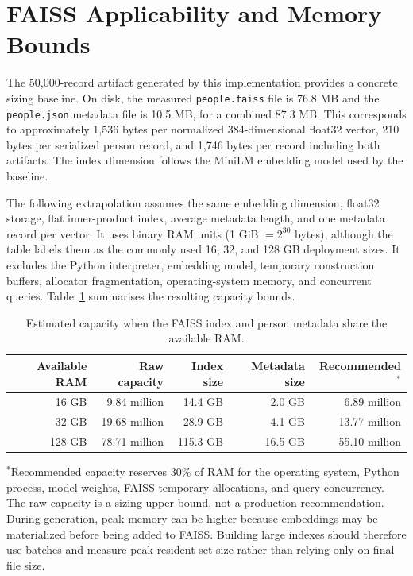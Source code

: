 \documentclass[11pt]{article}
\begin{document}
\section{FAISS Applicability and Memory Bounds}
The 50,000-record artifact generated by this implementation provides a concrete sizing baseline. On disk, the measured \texttt{people.faiss} file is 76.8 MB and the \texttt{people.json} metadata file is 10.5 MB, for a combined 87.3 MB. This corresponds to approximately 1,536 bytes per normalized 384-dimensional float32 vector, 210 bytes per serialized person record, and 1,746 bytes per record including both artifacts. The index dimension follows the MiniLM embedding model used by the baseline.

The following extrapolation assumes the same embedding dimension, float32 storage, flat inner-product index, average metadata length, and one metadata record per vector. It uses binary RAM units (1 GiB $=2^{30}$ bytes), although the table labels them as the commonly used 16, 32, and 128 GB deployment sizes. It excludes the Python interpreter, embedding model, temporary construction buffers, allocator fragmentation, operating-system memory, and concurrent queries. Table~\ref{tab:capacity} summarises the resulting capacity bounds.

\begin{table}[h]
\centering
\caption{Estimated capacity when the FAISS index and person metadata share the available RAM.}
\label{tab:capacity}
\begin{tabular}{rrrrr}
\toprule
Available RAM & Raw capacity & Index size & Metadata size & Recommended$^*$ \\
\midrule
16 GB & 9.84 million & 14.4 GB & 2.0 GB & 6.89 million \\
32 GB & 19.68 million & 28.9 GB & 4.1 GB & 13.77 million \\
128 GB & 78.71 million & 115.3 GB & 16.5 GB & 55.10 million \\
\bottomrule
\end{tabular}
\end{table}

\noindent
$^*$Recommended capacity reserves 30\% of RAM for the operating system, Python process, model weights, FAISS temporary allocations, and query concurrency. The raw capacity is a sizing upper bound, not a production recommendation. During generation, peak memory can be higher because embeddings may be materialized before being added to FAISS. Building large indexes should therefore use batches and measure peak resident set size rather than relying only on final file size.
\end{document}
